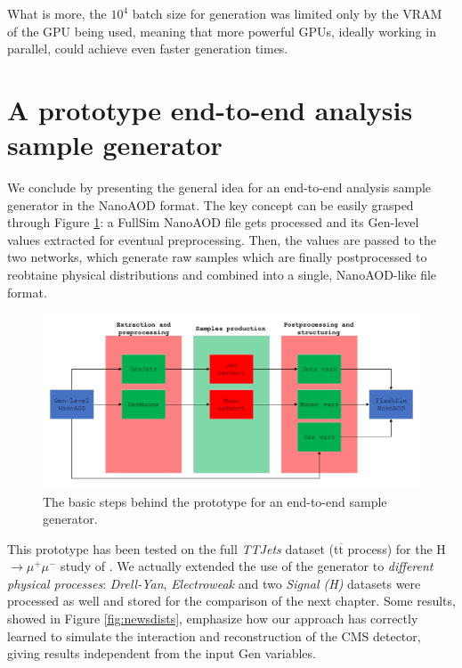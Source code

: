 What is more, the $10^{4}$ batch size for generation was limited only by the VRAM of the GPU being used, meaning that more powerful GPUs, ideally working in parallel, could achieve even faster generation times.


\section{A prototype end-to-end analysis sample generator}\label{sec:progen}

We conclude by presenting the general idea for an end-to-end analysis sample generator in the NanoAOD format. The key concept can be easily grasped through Figure \ref{fig:endtoend}: a FullSim NanoAOD file gets processed and its Gen-level values extracted for eventual preprocessing. Then, the values are passed to the two networks, which generate raw samples which are finally postprocessed to reobtaine physical distributions and combined into a single, NanoAOD-like file format.

\begin{figure}
    \centering
    \includegraphics[width=\linewidth]{gfx/ch5/endtoend.pdf}
    \caption[end-toend sample generator]{The basic steps behind the prototype for an end-to-end sample generator.}
    \label{fig:endtoend}
\end{figure}

This prototype has been tested on the full \emph{TTJets} dataset (t$\overline{\text{t}}$ process) for the H$\rightarrow\mu^+\mu^-$ study of \cite{Sirunyan_2021}. We actually extended the use of the generator to \emph{different physical processes}: \emph{Drell-Yan}, \emph{Electroweak} and two \emph{Signal (H)} datasets were processed as well and stored for the comparison of the next chapter. Some results, showed in Figure \ref{fig:newsdists}, emphasize how our approach has correctly learned to simulate the interaction and reconstruction of the CMS detector, giving results independent from the input Gen variables.

